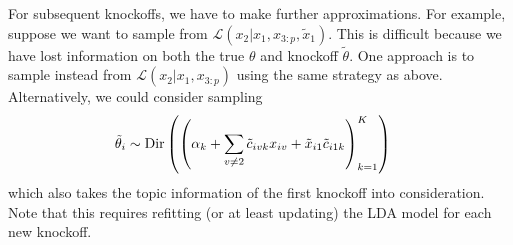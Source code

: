 \documentclass{article}
\begin{document}
For subsequent knockoffs, we have to make further approximations. For example,
suppose we want to sample from $\mathcal{L}\left(x_{2} \vert x_{1}, x_{3:p},
\tilde{x}_{1}\right)$. This is difficult because we have lost information on
both the true $\theta$ and knockoff $\tilde{\theta}$. One approach is to sample
instead from $\mathcal{L}\left(x_{2} \vert x_{1}, x_{3:p}\right)$ using the same
strategy as above. Alternatively, we could consider sampling 
\begin{align*}
 \tilde{\theta}_{i} &\sim \textnormal{Dir}\left(\left(\alpha_{k} + \sum_{v \neq 2} \tilde{c}_{ivk} x_{iv} + \tilde{x}_{i1}\tilde{c}_{i1k}\right)_{k = 1}^{K}\right) 
\end{align*}
which also takes the topic information of the first knockoff into consideration.
Note that this requires refitting (or at least updating) the LDA model for each
new knockoff.



\end{document}
